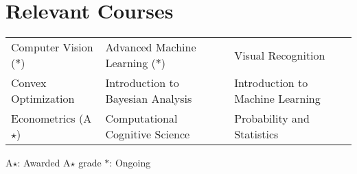 \setlength\extrarowheight{3pt}  %

\section*{Relevant Courses}
\begin{tabularx}{\textwidth}{L L L}
    Computer Vision ($\ast$)&
    Advanced Machine Learning ($\ast$)&
    Visual Recognition\\
    Convex Optimization&
    Introduction to Bayesian Analysis&
    Introduction to Machine Learning\\
    Econometrics (A$\star$)&
    Computational Cognitive Science&
    Probability and Statistics
\end{tabularx}

\vspace{2mm}
{\small A$\star$: Awarded A$\star$ grade \hspace{5mm} $\ast$: Ongoing}
